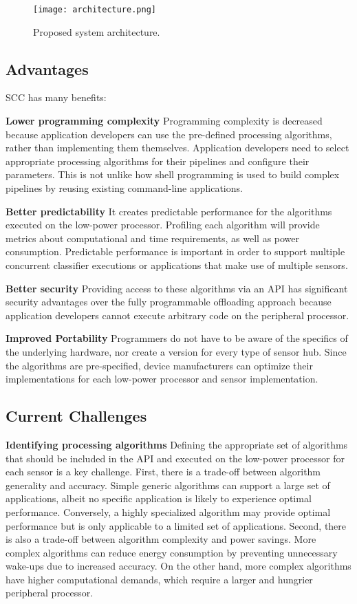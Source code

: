 \begin{figure}[t]
	\centering
	\texttt{[image: architecture.png]}
	\caption{Proposed system architecture.}
    \label{fig:architecture}
\end{figure}

\subsection{Advantages}

SCC has many benefits:

 {\bf Lower programming complexity}  Programming complexity is
  decreased because application developers can use the pre-defined
  processing algorithms, rather than implementing them themselves. 
  Application developers need to select appropriate processing 
  algorithms for their pipelines and configure their parameters. This 
  is not unlike how shell programming is used to build complex 
  pipelines by reusing existing command-line applications.
  

{\bf Better predictability} It 
  creates predictable performance for the algorithms executed on the
  low-power processor. Profiling each algorithm will provide metrics
  about computational and time requirements, as well as power
  consumption.  Predictable performance is important in order to
  support multiple concurrent classifier executions or applications
  that make use of multiple sensors.


{\bf Better security} Providing access to these algorithms via
  an API has significant security advantages over the fully
  programmable offloading approach because application developers
  cannot execute arbitrary code on the peripheral processor. 


{\bf Improved Portability} Programmers do not have to be
  aware of the specifics of the underlying hardware, nor create a version
  for every type of sensor hub. Since the algorithms are
  pre-specified, device manufacturers can optimize their
  implementations for each low-power processor and sensor
  implementation.



\subsection{Current Challenges}
\label{sec:currentChallenges}

{\bf Identifying processing algorithms} Defining the appropriate
set of algorithms that should be included in the API and executed on
the low-power processor for each sensor is a key challenge. First,
there is a trade-off between algorithm generality and accuracy.
Simple generic algorithms can support a large set of
applications, albeit no specific application is likely to experience
optimal performance.  Conversely, a highly specialized algorithm may
provide optimal performance but is only applicable to a limited set of
applications.  Second, there is also a trade-off between algorithm
complexity and power savings.  More complex algorithms can reduce
energy consumption by preventing unnecessary wake-ups due to increased
accuracy.  On the other hand, more complex algorithms have higher
computational demands, which require a larger and hungrier peripheral
processor.  

